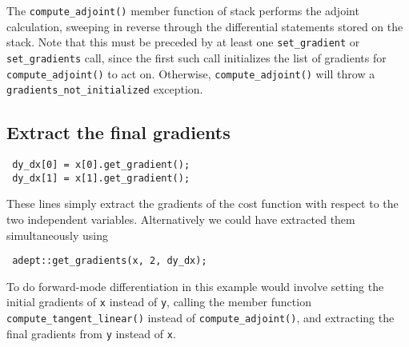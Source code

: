 \documentclass[a4,oneside]{book}
\def\codesize{\small}
\def\code#1{{\codesize\texttt{#1}}}
\begin{document}
The \code{compute\_adjoint()} member function of stack performs the
adjoint calculation, sweeping in reverse through the differential
statements stored on the stack. Note that this must be preceded by at
least one \code{set\_gradient} or \code{set\_gradients} call, since
the first such call initializes the list of gradients for
\code{compute\_adjoint()} to act on. Otherwise,
\code{compute\_adjoint()} will throw a
\code{gradients\_not\_initialized} exception. 

\subsection{Extract the final gradients}

\begin{lstlisting}
 dy_dx[0] = x[0].get_gradient();
 dy_dx[1] = x[1].get_gradient();
\end{lstlisting}
These lines simply extract the gradients of the cost function
with respect to the two independent variables. Alternatively we could
have extracted them simultaneously using
\begin{lstlisting}
 adept::get_gradients(x, 2, dy_dx);
\end{lstlisting}

To do forward-mode differentiation in this example would involve
setting the initial gradients of \code{x} instead of \code{y}, calling
the member function \code{compute\_tangent\_linear()} instead of
\code{compute\_adjoint()}, and extracting the final gradients from
\code{y} instead of \code{x}.
\end{document}
